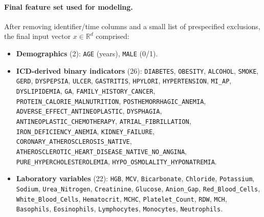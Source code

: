 \documentclass[journal,article,submit,pdftex,moreauthors]{Definitions/mdpi}
\begin{document}
\paragraph{Final feature set used for modeling.}
After removing identifier/time columns and a small list of prespecified exclusions, the final input vector $x\in\mathbb{R}^d$ comprised:
\begin{itemize}[leftmargin=12pt,topsep=2pt,itemsep=1pt]
  \item \textbf{Demographics} (2): \texttt{AGE} (years), \texttt{MALE} (0/1).
  \item \textbf{ICD-derived binary indicators} (26): \texttt{DIABETES}, \texttt{OBESITY}, \texttt{ALCOHOL}, \texttt{SMOKE}, \texttt{GERD}, \texttt{DYSPEPSIA}, \texttt{ULCER}, \texttt{GASTRITIS}, \texttt{HPYLORI}, \texttt{HYPERTENSION}, \texttt{MI\_AP}, \texttt{DYSLIPIDEMIA}, \texttt{GA}, \texttt{FAMILY\_HISTORY\_CANCER}, \texttt{PROTEIN\_CALORIE\_MALNUTRITION}, \texttt{POSTHEMORRHAGIC\_ANEMIA}, \texttt{ADVERSE\_EFFECT\_ANTINEOPLASTIC}, \texttt{DYSPHAGIA}, \texttt{ANTINEOPLASTIC\_CHEMOTHERAPY}, \texttt{ATRIAL\_FIBRILLATION}, \texttt{IRON\_DEFICIENCY\_ANEMIA}, \texttt{KIDNEY\_FAILURE}, \texttt{CORONARY\_ATHEROSCLEROSIS\_NATIVE}, \texttt{ATHEROSCLEROTIC\_HEART\_DISEASE\_NATIVE\_NO\_ANGINA}, \texttt{PURE\_HYPERCHOLESTEROLEMIA}, \texttt{HYPO\_OSMOLALITY\_HYPONATREMIA}.
  \item \textbf{Laboratory variables} (22): \texttt{HGB}, \texttt{MCV}, \texttt{Bicarbonate}, \texttt{Chloride}, \texttt{Potassium}, \texttt{Sodium}, \texttt{Urea\_Nitrogen}, \texttt{Creatinine}, \texttt{Glucose}, \texttt{Anion\_Gap}, \texttt{Red\_Blood\_Cells}, \texttt{White\_Blood\_Cells}, \texttt{Hematocrit}, \texttt{MCHC}, \texttt{Platelet\_Count}, \texttt{RDW}, \texttt{MCH}, \texttt{Basophils}, \texttt{Eosinophils}, \texttt{Lymphocytes}, \texttt{Monocytes}, \texttt{Neutrophils}.
\end{itemize}



\end{document}
